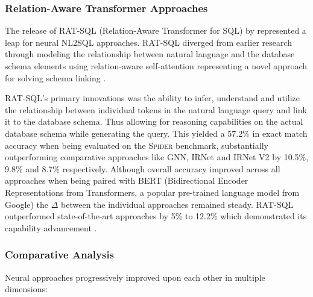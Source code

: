 \subsubsection{Relation-Aware Transformer Approaches}

The release of RAT-SQL (Relation-Aware Transformer for SQL) by \cite{RATSQL}
represented a leap for neural NL2SQL approaches. RAT-SQL diverged from earlier
research through modeling the relationship between natural language and the
database schema elements using relation-aware self-attention representing a
novel approach for solving schema linking \citep{RATSQL}.

RAT-SQL's primary innovations was the ability to infer, understand and utilize
the relationship between individual tokens in the natural language query and
link it to the database schema. Thus allowing for reasoning capabilities on the
actual database schema while generating the query. This yielded a 57.2\% in
exact match accuracy when being evaluated on the \textsc{Spider} benchmark,
substantially outperforming comparative approaches like GNN, IRNet and IRNet V2
by 10.5\%, 9.8\% and 8.7\% respectively. Although overall accuracy improved
across all approaches when being paired with BERT (Bidirectional Encoder
Representations from Transformers, a popular pre-trained language model from
Google) the $\Delta$ between the individual approaches remained steady. RAT-SQL
outperformed state-of-the-art approaches by 5\% to 12.2\% which demonstrated
its capability advancement \citep{RATSQL}.

\subsubsection{Comparative Analysis}

Neural approaches progressively improved upon each other in multiple dimensions:


